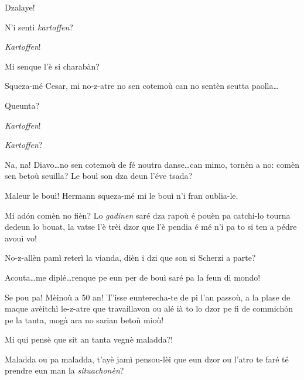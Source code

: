 \begin{drama}
\Cesarspeaks Dzalaye!

\Katrinspeaks N'i sentì \textit{kartoffen}?

\Peterspeaks \textit{Kartoffen}!



\Cesarspeaks Mi senque l'è si charabàn?

\Hermannspeaks{} Squeza-mé Cesar, mi no-z-atre no sen cotemoù can no sentèn seutta paolla\ldots

\Cesarspeaks Queunta?

\Hermannspeaks \textit{Kartoffen}!

\Katrinspeaks \textit{Kartoffen}?


\Hermannspeaks{} Na, na! Diavo\ldots no sen cotemoù de fé noutra danse\ldots can mimo, tornèn a no: comèn sen betoù seuilla? Le bouì son dza deun l'éve tsada?

\Cesarspeaks Maleur le bouì! Hermann squeza-mé mi le bouì n'i fran oublia-le.

\Hermannspeaks{} Mi ad\'on comèn no fièn? Lo \textit{gadinen} saré dza rapoù é pouèn pa catchi-lo tourna dedeun lo bouat, la vatse l'è trèi dzor que l'è pendia é mé n'i pa to si ten a pédre avouì vo! 


\Hermannspeaks{} No-z-allèn pamì reterì la vianda, dièn i dzi que son si \og Scherzi a parte\fg ?

\Cesarspeaks {} Acouta\ldots me diplé\ldots renque pe eun per de bouì saré pa la feun di mondo!

\Hermannspeaks Se pou pa! Mèinoù a 50 an! T’isse eunterecha-te de pi l'an passoù, a la plase de maque avèitchì le-z-atre que travaillavon ou alé ià to lo dzor pe fi de commich\'on pe la tanta, mogà ara no sarian betoù mioù!

\Cesarspeaks Mi qui pensè que sit an tanta vegnè maladda?!

\Hermannspeaks{} Maladda ou pa maladda, t'ayè jamì pensou-lèi que eun dzor ou l’atro te faré té prendre eun man la \textit{situachonèn}? 


\end{drama}
